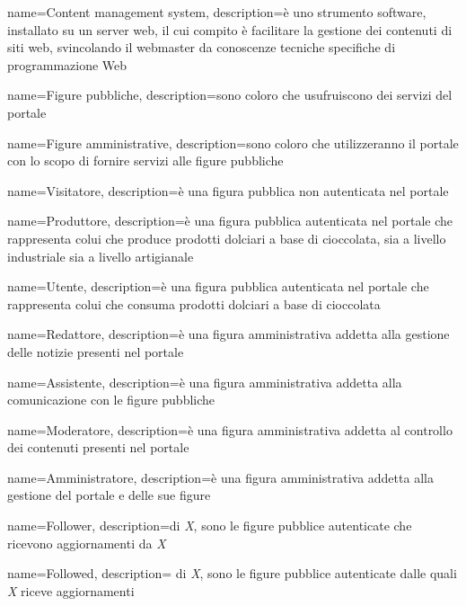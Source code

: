 
{
    name={Content management system},
    description={è uno strumento software, installato su un server web, il cui
        compito è facilitare la gestione dei contenuti di siti web, svincolando il
        webmaster da conoscenze tecniche specifiche di programmazione Web}
}

{
    name={Figure pubbliche},
    description={sono coloro che usufruiscono dei servizi del portale}
}

{
    name={Figure amministrative},
    description={sono coloro che utilizzeranno il portale con lo scopo di fornire servizi alle figure pubbliche}
}

{
    name={Visitatore},
    description={è una figura pubblica non autenticata nel portale}
}

{
    name={Produttore},
    description={è una figura pubblica autenticata nel portale che rappresenta colui che produce prodotti dolciari a base di cioccolata, sia a livello industriale sia a livello artigianale}
}

{
    name={Utente},
    description={è una figura pubblica autenticata nel portale che rappresenta colui che consuma prodotti dolciari a base di cioccolata}
}

{
    name={Redattore},
    description={è una figura amministrativa addetta alla gestione delle notizie presenti nel portale}
}

{
    name={Assistente},
    description={è una figura amministrativa addetta alla comunicazione con le figure pubbliche}
}

{
    name={Moderatore},
    description={è una figura amministrativa addetta al controllo dei contenuti presenti nel portale}
}

{
    name={Amministratore},
    description={è una figura amministrativa addetta alla gestione del portale e delle sue figure}
}

{
    name={Follower},
    description={di \emph{X}, sono le figure pubblice autenticate che ricevono aggiornamenti da \emph{X}}
}

{
    name={Followed},
    description={ di \emph{X}, sono le figure pubblice autenticate dalle quali \emph{X} riceve aggiornamenti}
}


